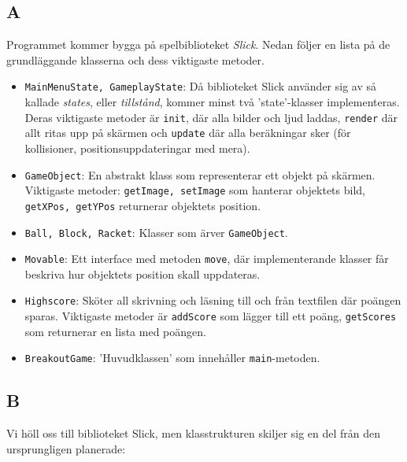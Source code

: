 \documentclass[11pt,a4paper]{article}
\begin{document}
\subsection{A}
Programmet kommer bygga på spelbiblioteket \emph{Slick}. Nedan följer en lista på de grundläggande klasserna och dess viktigaste metoder.

\begin{itemize}
	\item \texttt{MainMenuState, GameplayState}: Då biblioteket Slick använder sig av så kallade \emph{states}, eller \emph{tillstånd}, kommer minst två 'state'-klasser implementeras. Deras viktigaste metoder är \texttt{init}, där alla bilder och ljud laddas, \texttt{render} där allt ritas upp på skärmen och \texttt{update} där alla beräkningar sker (för kollisioner, positionsuppdateringar med mera).
	\item \texttt{GameObject}: En abstrakt klass som representerar ett objekt på skärmen. Viktigaste metoder: \texttt{getImage, setImage} som hanterar objektets bild, \texttt{getXPos, getYPos} returnerar objektets position.
	\item \texttt{Ball, Block, Racket}: Klasser som ärver \texttt{GameObject}.
	\item \texttt{Movable}: Ett interface med metoden \texttt{move}, där implementerande klasser får beskriva hur objektets position skall uppdateras.
	\item \texttt{Highscore}: Sköter all skrivning och läsning till och från textfilen där poängen sparas. Viktigaste metoder är \texttt{addScore} som lägger till ett poäng, \texttt{getScores} som returnerar en lista med poängen.
	\item \texttt{BreakoutGame}: 'Huvudklassen' som innehåller \texttt{main}-metoden.
\end{itemize}

\subsection{B}
Vi höll oss till biblioteket Slick, men klasstrukturen skiljer sig en del från den ursprungligen planerade:
\end{document}
